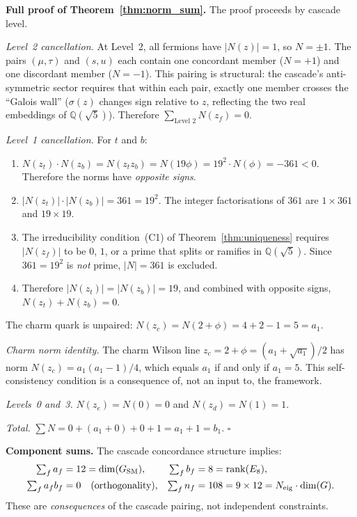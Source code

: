 \documentclass[12pt,a4paper]{article}
\theoremstyle{definition}
\begin{document}
\textbf{Full proof of Theorem~\ref{thm:norm_sum}.}
The proof proceeds by cascade level.

\emph{Level~2 cancellation.}  At Level~2, all fermions have $|N(z)| = 1$, so $N = \pm 1$.  The pairs $(\mu, \tau)$ and $(s, u)$ each contain one concordant member ($N = +1$) and one discordant member ($N = -1$).  This pairing is structural: the cascade's anti-symmetric sector requires that within each pair, exactly one member crosses the ``Galois wall'' ($\sigma(z)$ changes sign relative to $z$, reflecting the two real embeddings of $\mathbb{Q}(\sqrt{5})$).  Therefore $\sum_{\text{Level 2}} N(z_f) = 0$.

\emph{Level~1 cancellation.}  For $t$ and $b$:
\begin{enumerate}
\item $N(z_t) \cdot N(z_b) = N(z_t z_b) = N(19\phi) = 19^2 \cdot N(\phi) = -361 < 0$.  Therefore the norms have \emph{opposite signs}.
\item $|N(z_t)| \cdot |N(z_b)| = 361 = 19^2$.  The integer factorisations of $361$ are $1 \times 361$ and $19 \times 19$.
\item The irreducibility condition~(C1) of Theorem~\ref{thm:uniqueness} requires $|N(z_f)|$ to be $0$, $1$, or a prime that splits or ramifies in $\mathbb{Q}(\sqrt{5})$.  Since $361 = 19^2$ is \emph{not} prime, $|N| = 361$ is excluded.
\item Therefore $|N(z_t)| = |N(z_b)| = 19$, and combined with opposite signs, $N(z_t) + N(z_b) = 0$.
\end{enumerate}
The charm quark is unpaired: $N(z_c) = N(2+\phi) = 4 + 2 - 1 = 5 = a_1$.

\emph{Charm norm identity.}  The charm Wilson line $z_c = 2 + \phi = (a_1 + \sqrt{a_1})/2$ has norm $N(z_c) = a_1(a_1-1)/4$, which equals $a_1$ if and only if $a_1 = 5$.  This self-consistency condition is a consequence of, not an input to, the framework.

\emph{Levels~0 and~3.}  $N(z_e) = N(0) = 0$ and $N(z_d) = N(1) = 1$.

\emph{Total.}  $\sum N = 0 + (a_1 + 0) + 0 + 1 = a_1 + 1 = b_1$.  \hfill$\square$

\textbf{Component sums.}  The cascade concordance structure implies:
\begin{align}
\textstyle\sum_f a_f &= 12 = \dim(G_{\text{SM}}), &
\textstyle\sum_f b_f &= 8 = \mathrm{rank}(E_8), \\
\textstyle\sum_f a_f b_f &= 0 \quad \text{(orthogonality)}, &
\textstyle\sum_f n_f &= 108 = 9 \times 12 = N_{\text{eig}} \cdot \dim(G). \notag
\end{align}
These are \emph{consequences} of the cascade pairing, not independent constraints.
\end{document}

